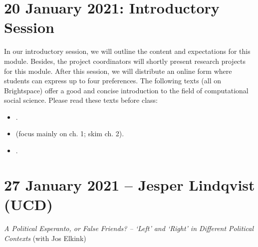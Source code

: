 \documentclass[abstract=on,parskip=full,headings=standardclasses,fontsize=11pt,paper=a4]{scrartcl}
\begin{document}



\tableofcontents

\section{20 January 2021: Introductory Session} \label{introsession}

In our introductory session, we will outline the content and expectations for this module. Besides, the project coordinators will shortly present  research projects for this module. After this session, we will distribute an online form where students can express up to four preferences. The following texts (all on Brightspace) offer a good and concise introduction to the field of computational social science. Please read these texts before class:


\begin{itemize}
\item {}. 
\item {} (focus mainly on ch. 1; skim ch. 2).
\item {}.
\end{itemize}



\section{27 January 2021 -- Jesper Lindqvist (UCD)}

\textit{A Political Esperanto, or False Friends? – `Left' and `Right' in Different Political Contexts} (with Jos Elkink)
 
\end{document}
